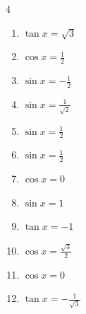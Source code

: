 \begin{multicols}{4}
\begin{enumerate}
  \item $\displaystyle \tan{x}  = \sqrt{3}$


  \item $\displaystyle \cos{x}  = \frac{1}{2}$


  \item $\displaystyle \sin{x}  = -\frac{1}{2}$


  \item $\displaystyle \sin{x}  = \frac{1}{\sqrt{2}}$


  \item $\displaystyle \sin{x}  = \frac{1}{2}$


  \item $\displaystyle \sin{x}  = \frac{1}{2}$


  \item $\displaystyle \cos{x}  = 0$


  \item $\displaystyle \sin{x}  = 1$


  \item $\displaystyle \tan{x}  = -1$


\columnbreak %

  \item $\displaystyle \cos{x}  = \frac{\sqrt{3}}{2}$


  \item $\displaystyle \cos{x}  = 0$


  \item $\displaystyle \tan{x}  = -\frac{1}{\sqrt{3}}$


\end{enumerate}
\end{multicols}
